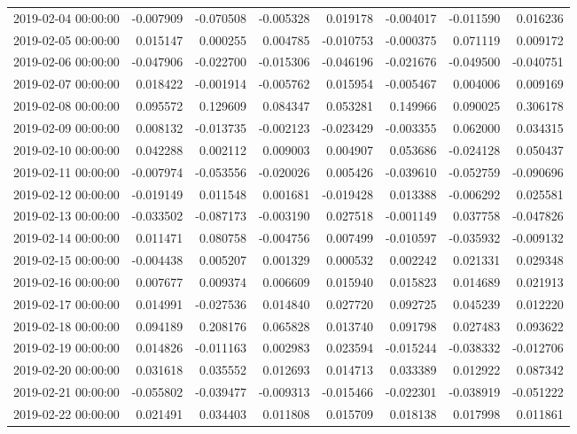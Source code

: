 \begin{tabular}{lrrrrrrr}
2019-02-04 00:00:00 & -0.007909 & -0.070508 & -0.005328 & 0.019178 & -0.004017 & -0.011590 & 0.016236 \\
2019-02-05 00:00:00 & 0.015147 & 0.000255 & 0.004785 & -0.010753 & -0.000375 & 0.071119 & 0.009172 \\
2019-02-06 00:00:00 & -0.047906 & -0.022700 & -0.015306 & -0.046196 & -0.021676 & -0.049500 & -0.040751 \\
2019-02-07 00:00:00 & 0.018422 & -0.001914 & -0.005762 & 0.015954 & -0.005467 & 0.004006 & 0.009169 \\
2019-02-08 00:00:00 & 0.095572 & 0.129609 & 0.084347 & 0.053281 & 0.149966 & 0.090025 & 0.306178 \\
2019-02-09 00:00:00 & 0.008132 & -0.013735 & -0.002123 & -0.023429 & -0.003355 & 0.062000 & 0.034315 \\
2019-02-10 00:00:00 & 0.042288 & 0.002112 & 0.009003 & 0.004907 & 0.053686 & -0.024128 & 0.050437 \\
2019-02-11 00:00:00 & -0.007974 & -0.053556 & -0.020026 & 0.005426 & -0.039610 & -0.052759 & -0.090696 \\
2019-02-12 00:00:00 & -0.019149 & 0.011548 & 0.001681 & -0.019428 & 0.013388 & -0.006292 & 0.025581 \\
2019-02-13 00:00:00 & -0.033502 & -0.087173 & -0.003190 & 0.027518 & -0.001149 & 0.037758 & -0.047826 \\
2019-02-14 00:00:00 & 0.011471 & 0.080758 & -0.004756 & 0.007499 & -0.010597 & -0.035932 & -0.009132 \\
2019-02-15 00:00:00 & -0.004438 & 0.005207 & 0.001329 & 0.000532 & 0.002242 & 0.021331 & 0.029348 \\
2019-02-16 00:00:00 & 0.007677 & 0.009374 & 0.006609 & 0.015940 & 0.015823 & 0.014689 & 0.021913 \\
2019-02-17 00:00:00 & 0.014991 & -0.027536 & 0.014840 & 0.027720 & 0.092725 & 0.045239 & 0.012220 \\
2019-02-18 00:00:00 & 0.094189 & 0.208176 & 0.065828 & 0.013740 & 0.091798 & 0.027483 & 0.093622 \\
2019-02-19 00:00:00 & 0.014826 & -0.011163 & 0.002983 & 0.023594 & -0.015244 & -0.038332 & -0.012706 \\
2019-02-20 00:00:00 & 0.031618 & 0.035552 & 0.012693 & 0.014713 & 0.033389 & 0.012922 & 0.087342 \\
2019-02-21 00:00:00 & -0.055802 & -0.039477 & -0.009313 & -0.015466 & -0.022301 & -0.038919 & -0.051222 \\
2019-02-22 00:00:00 & 0.021491 & 0.034403 & 0.011808 & 0.015709 & 0.018138 & 0.017998 & 0.011861 \\

\end{tabular}
